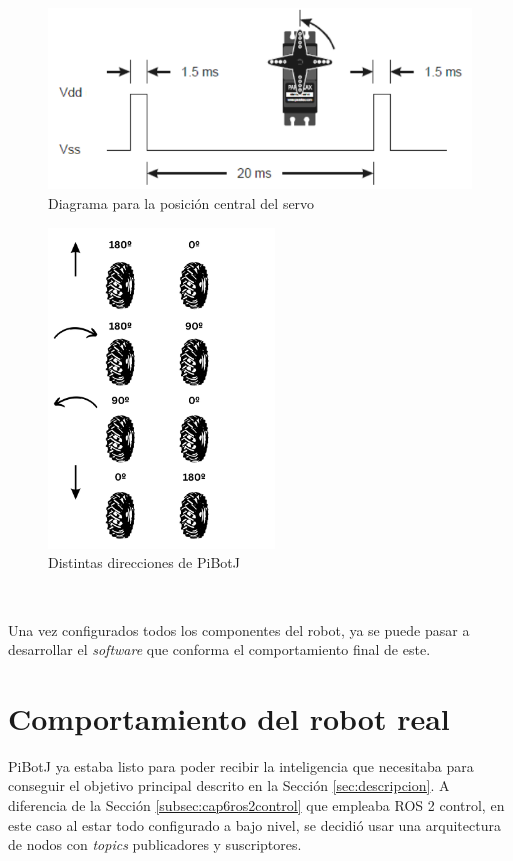  \begin{figure} [h!]
	\begin{center}
		\includegraphics[width=12cm]{figs/cap6/pwm.png}
	\end{center}
	\caption{Diagrama para la posición central del servo}
	\label{fig:pwm}
\end{figure}

 \begin{figure} [h!]
	\begin{center}
		\includegraphics[width=6cm]{figs/cap6/motorlogic.png}
	\end{center}
	\caption{Distintas direcciones de PiBotJ}
	\label{fig:motorlogic}
\end{figure}\

Una vez configurados todos los componentes del robot, ya se puede pasar a desarrollar el \textit{software} que conforma el comportamiento final de este. 
 

\section{Comportamiento del robot real}
\label{sec:softwarerf}

PiBotJ ya estaba listo para poder recibir la inteligencia que necesitaba para conseguir el objetivo principal descrito en la Sección \ref{sec:descripcion}. A diferencia de la Sección \ref{subsec:cap6ros2control} que empleaba ROS 2 control, en este caso al estar todo configurado a bajo nivel, se decidió usar una arquitectura de nodos con \textit{topics} publicadores y suscriptores.


